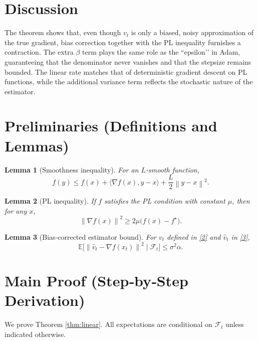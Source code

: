 \documentclass{article}
\newtheorem{lemma}{Lemma}
\newcommand{\E}{\mathbb{E}}
\newcommand{\norm}[1]{\left\|#1\right\|}
\newcommand{\ip}[2]{\langle #1,#2\rangle}
\begin{document}
\section*{Discussion}
The theorem shows that, even though $v_t$ is only a biased, noisy approximation of the true gradient, bias correction together with the PL inequality furnishes a contraction. The extra $\beta$ term plays the same role as the “epsilon’’ in Adam, guaranteeing that the denominator never vanishes and that the stepsize remains bounded. The linear rate matches that of deterministic gradient descent on PL functions, while the additional variance term reflects the stochastic nature of the estimator.

\newpage
\section*{Preliminaries (Definitions and Lemmas)}
\begin{lemma}[Smoothness inequality]\label{lem:smooth}
For an $L$‑smooth function,
\[
    f(y) \le f(x) + \ip{\nabla f(x)}{y-x} + \frac{L}{2}\norm{y-x}^2 .
\]
\end{lemma}
\begin{lemma}[PL inequality]\label{lem:pl}
If $f$ satisfies the PL condition with constant $\mu$, then for any $x$,
\[
    \norm{\nabla f(x)}^2 \ge 2\mu\bigl(f(x)-f^\star\bigr).
\]
\end{lemma}
\begin{lemma}[Bias‑corrected estimator bound]\label{lem:est}
For $v_t$ defined in \eqref{2} and $\hat v_t$ in \eqref{3},
\[
    \E\!\bigl[\norm{\hat v_t-\nabla f(x_t)}^2\mid\mathcal{F}_t\bigr]\le \sigma^2\alpha .
\]
\end{lemma}

\section*{Main Proof (Step‑by‑Step Derivation)}
We prove Theorem \ref{thm:linear}. All expectations are conditional on $\mathcal{F}_t$ unless indicated otherwise.
\end{document}
